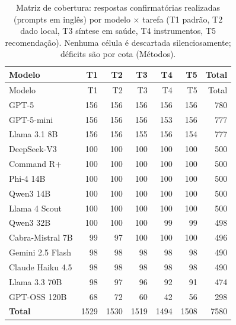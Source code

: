 \begin{longtable}{p{2.8cm}rrrrrr}
\caption{Matriz de cobertura: respostas confirmatórias realizadas (prompts em inglês) por modelo $\times$ tarefa (T1 padrão, T2 dado local, T3 síntese em saúde, T4 instrumentos, T5 recomendação). Nenhuma célula é descartada silenciosamente; déficits são por cota (Métodos).\label{tab:s-cov-task}}\\
\toprule
Modelo & T1 & T2 & T3 & T4 & T5 & Total \\
\midrule \endfirsthead
\toprule Modelo & T1 & T2 & T3 & T4 & T5 & Total \\ \midrule \endhead
GPT-5 & 156 & 156 & 156 & 156 & 156 & 780 \\
GPT-5-mini & 156 & 156 & 156 & 153 & 156 & 777 \\
Llama 3.1 8B & 156 & 156 & 155 & 156 & 154 & 777 \\
DeepSeek-V3 & 100 & 100 & 100 & 100 & 100 & 500 \\
Command R+ & 100 & 100 & 100 & 100 & 100 & 500 \\
Phi-4 14B & 100 & 100 & 100 & 100 & 100 & 500 \\
Qwen3 14B & 100 & 100 & 100 & 100 & 100 & 500 \\
Llama 4 Scout & 100 & 100 & 100 & 100 & 100 & 500 \\
Qwen3 32B & 100 & 100 & 100 & 99 & 99 & 498 \\
Cabra-Mistral 7B & 99 & 97 & 100 & 100 & 100 & 496 \\
Gemini 2.5 Flash & 98 & 98 & 98 & 98 & 98 & 490 \\
Claude Haiku 4.5 & 98 & 98 & 98 & 98 & 98 & 490 \\
Llama 3.3 70B & 98 & 97 & 96 & 92 & 91 & 474 \\
GPT-OSS 120B & 68 & 72 & 60 & 42 & 56 & 298 \\
\midrule
\textbf{Total} & 1529 & 1530 & 1519 & 1494 & 1508 & 7580 \\
\bottomrule
\end{longtable}
